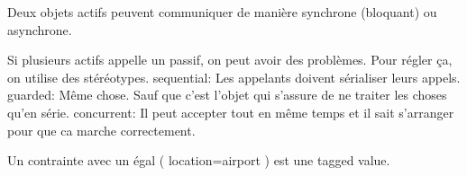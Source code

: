 Deux objets actifs peuvent communiquer de manière synchrone (bloquant) ou asynchrone.

Si plusieurs actifs appelle un passif, on peut avoir des problèmes. Pour régler ça, on utilise des stéréotypes.
sequential: Les appelants doivent sérialiser leurs appels.
guarded: Même chose. Sauf que c’est l’objet qui s’assure de ne traiter les choses qu’en série.
concurrent: Il peut accepter tout en même temps et il sait s’arranger pour que ca marche correctement.

Un contrainte avec un égal ( {location=airport} ) est une tagged value.